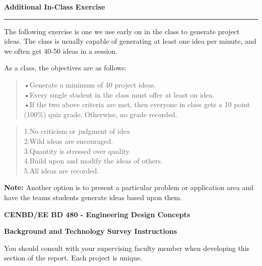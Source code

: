 \begin{enumerate}
\begin{onlysolution}
\textbf{Additional In-Class Exercise}

\noindent\rule[0.5ex]{\linewidth}{1pt}

The following exercise is one we use early on in the class to generate
project ideas. The class is usually capable of generating at least one
idea per minute, and we often get 40-50 ideas in a session.

As a class, the objectives are as follows:

\begin{quote}
•Generate a minimum of 40 project ideas.\\
•Every single student in the class must offer at least on idea.\\
•If the two above criteria are met, then everyone in class gets a 10
point (100\%) quiz grade. Otherwise, no grade recorded.
\end{quote}


\begin{quote}
1.No criticism or judgment of idea\\
2.Wild ideas are encouraged.\\
3.Quantity is stressed over quality.\\
4.Build upon and modify the ideas of others.\\
5.All ideas are recorded.
\end{quote}

\textbf{Note:} Another option is to present a particular problem
or application area and have the teams students generate ideas based
upon them.

\textbf{CENBD/EE BD 480 - Engineering Design Concepts}\\
\textbf{}

\begin{center}
\textbf{Background and Technology Survey Instructions}
\end{center}

You should consult with your supervising faculty member when developing
this section of the report. Each project is unique.


\end{onlysolution}
\end{enumerate}
